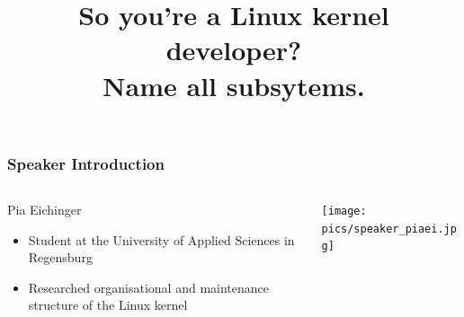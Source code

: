 \documentclass{beamer}
\title{So you're a Linux kernel developer? \\Name all subsytems.}
\begin{document}




	\begin{frame}
	\frametitle{Speaker Introduction}
	\begin{columns}
		\begin{column}{0.55\textwidth}
			\begin{block}{Pia Eichinger}
			\begin{itemize}
			\item Student at the University of Applied Sciences in Regensburg
			\item Researched organisational and maintenance structure of the Linux kernel
			\end{itemize}
			\end{block}
		\end{column}
		\begin{column}{0.4\textwidth}
     		\texttt{[image: pics/speaker\_piaei.jpg]}
		\end{column}
	\end{columns}
	\end{frame}
\end{document}
